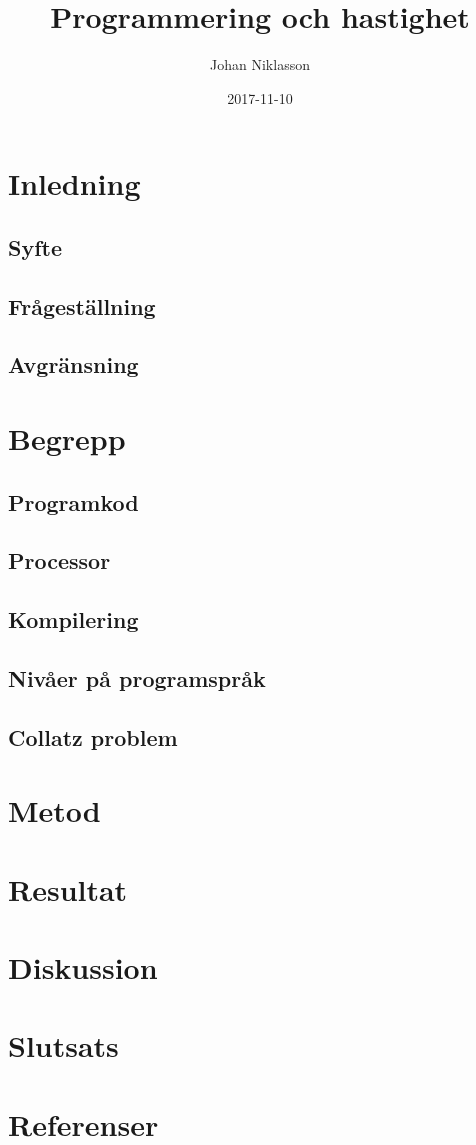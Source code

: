 \documentclass[swedish]{report}
\title{Programmering och hastighet}
\author{Johan Niklasson}
\date{2017-11-10}
\begin{document}
\maketitle
\tableofcontents

\clearpage

\section{Inledning}
\subsection{Syfte}
\subsection{Frågeställning}
\subsection{Avgränsning}

\section{Begrepp}
\subsection{Programkod}
\subsection{Processor}
\subsection{Kompilering}
\subsection{Nivåer på programspråk}
\subsection{Collatz problem}

\section{Metod}

\section{Resultat}

\section{Diskussion}

\section{Slutsats}

\section{Referenser}
\printbibliography
\end{document}
